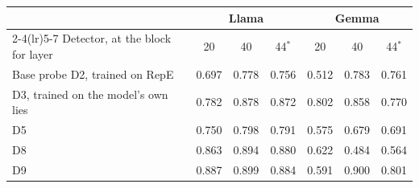 \begin{tabular}{@{}l ccc ccc@{}}
\toprule
 & \multicolumn{3}{c}{Llama} & \multicolumn{3}{c}{Gemma} \\
\cmidrule(lr){2-4}\cmidrule(lr){5-7}
Detector, at the block for layer & 20 & 40 & 44$^*$ & 20 & 40 & 44$^*$ \\
\midrule
Base probe D2, trained on RepE & 0.697 & 0.778 & 0.756 & 0.512 & 0.783 & 0.761 \\
D3, trained on the model's own lies & 0.782 & 0.878 & 0.872 & 0.802 & 0.858 & 0.770 \\
D5 & 0.750 & 0.798 & 0.791 & 0.575 & 0.679 & 0.691 \\
D8 & 0.863 & 0.894 & 0.880 & 0.622 & 0.484 & 0.564 \\
D9 & 0.887 & 0.899 & 0.884 & 0.591 & 0.900 & 0.801 \\
\bottomrule
\end{tabular}
